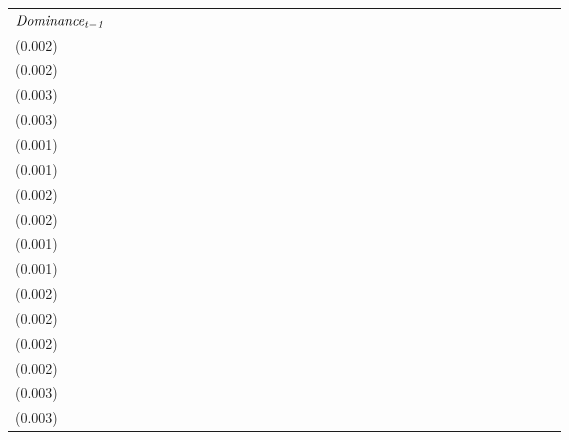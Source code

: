 \begin{tabular}{lllllllllllllllllllllllllllllllll}
$\it Dominance_{t-1}$        &                                     &                                     &                                     &                                     &   \makecell{$0.920^{**}$ \\(0.002)} &   \makecell{$0.920^{**}$ \\(0.002)} &   \makecell{$0.828^{**}$ \\(0.003)} &  \makecell{$0.829^{**}$ \\(0.003)} &                                     &                                     &                                     &                                     &   \makecell{$0.971^{**}$ \\(0.001)} &   \makecell{$0.971^{**}$ \\(0.001)} &   \makecell{$0.963^{**}$ \\(0.002)} &   \makecell{$0.963^{**}$ \\(0.002)} &                                     &                                     &                                     &                                     &   \makecell{$0.973^{**}$ \\(0.001)} &   \makecell{$0.973^{**}$ \\(0.001)} &   \makecell{$0.957^{**}$ \\(0.002)} &   \makecell{$0.957^{**}$ \\(0.002)} &                                     &                                     &                                     &                                    &  \makecell{$0.948^{**}$ \\(0.002)} &  \makecell{$0.948^{**}$ \\(0.002)} &  \makecell{$0.896^{**}$ \\(0.003)} &  \makecell{$0.896^{**}$ \\(0.003)} \\

\end{tabular}
